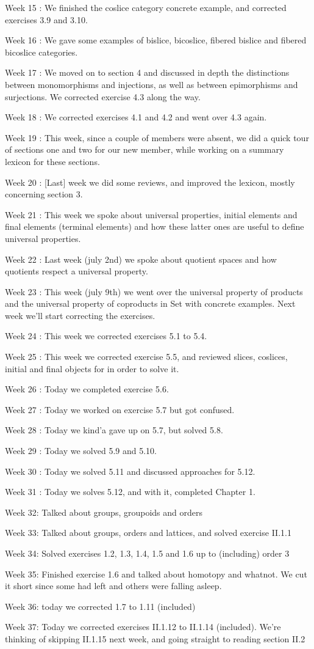 Week 15 : We finished the coslice category concrete example, and corrected exercises 3.9 and 3.10.

Week 16 : We gave some examples of bislice, bicoslice, fibered bislice and fibered bicoslice categories.

Week 17 : We moved on to section 4 and discussed in depth the distinctions between monomorphisms and injections, as well as between epimorphisms and surjections. We corrected exercise 4.3 along the way.

Week 18 : We corrected exercises 4.1 and 4.2 and went over 4.3 again.

Week 19 : This week, since a couple of members were absent, we did a quick tour of sections one and two for our new member, while working on a summary lexicon for these sections.

Week 20 : [Last] week we did some reviews, and improved the lexicon, mostly concerning section 3.

Week 21 : This week we spoke about universal properties, initial elements and final elements (terminal elements) and how these latter ones are useful to define universal properties.

Week 22 : Last week (july 2nd) we spoke about quotient spaces and how quotients respect a universal property.

Week 23 : This week (july 9th) we went over the universal property of products and the universal property of coproducts in Set with concrete examples. Next week we'll start correcting the exercises.

Week 24 : This week we corrected exercises 5.1 to 5.4.

Week 25 : This week we corrected exercise 5.5, and reviewed slices, coslices, initial and final objects for in order to solve it.

Week 26 : Today we completed exercise 5.6.

Week 27 : Today we worked on exercise 5.7 but got confused.

Week 28 : Today we kind'a gave up on 5.7, but solved 5.8.

Week 29 : Today we solved 5.9 and 5.10.

Week 30 : Today we solved 5.11 and discussed approaches for 5.12.

Week 31 : Today we solves 5.12, and with it, completed Chapter 1.

Week 32: Talked about groups, groupoids and orders

Week 33: Talked about groups, orders and lattices, and solved exercise II.1.1

Week 34: Solved exercises 1.2, 1.3, 1.4, 1.5 and 1.6 up to (including) order 3

Week 35: Finished exercise 1.6 and talked about homotopy and whatnot. We cut it short since some had left and others were falling asleep.

Week 36: today we corrected 1.7 to 1.11 (included)

Week 37: Today we corrected exercises II.1.12 to II.1.14 (included). We're thinking of skipping II.1.15 next week, and going straight to reading section II.2

\newpage

